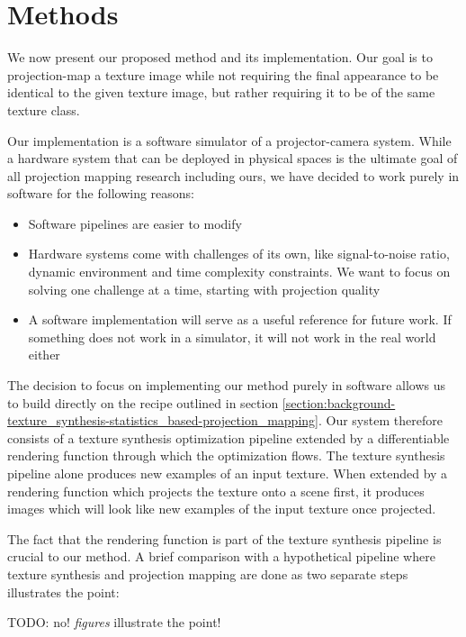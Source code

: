 \chapter{Methods}
\label{chapter:methods}


We now present our proposed method and its implementation. Our goal is to projection-map a texture image while not requiring the final appearance to be identical to the given texture image, but rather requiring it to be of the same texture class.

Our implementation is a software simulator of a projector-camera system. While a hardware system that can be deployed in physical spaces is the ultimate goal of all projection mapping research including ours, we have decided to work purely in software for the following reasons:

\begin{itemize}
    \item Software pipelines are easier to modify
    \item Hardware systems come with challenges of its own, like signal-to-noise ratio, dynamic environment and time complexity constraints. We want to focus on solving one challenge at a time, starting with projection quality
    \item A software implementation will serve as a useful reference for future work. If something does not work in a simulator, it will not work in the real world either
\end{itemize}

The decision to focus on implementing our method purely in software allows us to build directly on the recipe outlined in section \ref{section:background-texture_synthesis-statistics_based-projection_mapping}. Our system therefore consists of a texture synthesis optimization pipeline extended by a differentiable rendering function through which the optimization flows. The texture synthesis pipeline alone produces new examples of an input texture. When extended by a rendering function which projects the texture onto a scene first, it produces images which will look like new examples of the input texture once projected.

The fact that the rendering function is part of the texture synthesis pipeline is crucial to our method. A brief comparison with a hypothetical pipeline where texture synthesis and projection mapping are done as two separate steps illustrates the point:

{\color{red} TODO: no! \textit{figures} illustrate the point!}

